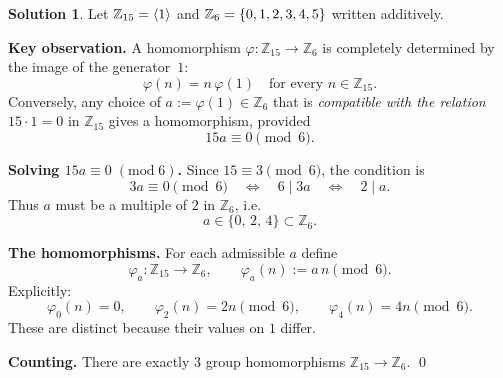 \documentclass[12pt]{article}
\theoremstyle{definition} %
\newtheorem{solution}{Solution}
\theoremstyle{plain} %
\begin{document}
        \begin{solution}
          Let $\Bbb Z_{15}=\langle 1\rangle$ and $\Bbb Z_{6}=\{0,1,2,3,4,5\}$ written additively.
          
          \medskip
          \textbf{Key observation.}  
          A homomorphism $\varphi:\mathbb{Z}_{15}\to\mathbb{Z}_{6}$ is completely determined by the image of the generator~$1$:
          \[
                  \varphi(n)=n\,\varphi(1)\quad\text{for every }n\in\mathbb{Z}_{15}.
          \]
          Conversely, any choice of $a:=\varphi(1)\in\mathbb{Z}_{6}$ that is \emph{compatible with the relation}
          $15\cdot 1 = 0$ in $\mathbb{Z}_{15}$ gives a homomorphism, provided
          \[
                  15a \equiv 0 \pmod{6}.
          \]
          
          \medskip
          \textbf{Solving $15a\equiv 0\;(\mathrm{mod}\;6)$.}\;
          Since $15\equiv 3\pmod 6$, the condition is
          \[
                  3a \equiv 0 \pmod 6
                  \quad\Longleftrightarrow\quad
                  6 \mid 3a
                  \quad\Longleftrightarrow\quad
                  2 \mid a.
          \]
          Thus $a$ must be a multiple of $2$ in $\mathbb{Z}_{6}$, i.e.\ 
          \[
             a\in\{0,\,2,\,4\}\subset\mathbb{Z}_{6}.
          \]
          
          \medskip
          \textbf{The homomorphisms.}\;
          For each admissible $a$ define
          \[
                \varphi_{a} :\mathbb{Z}_{15}\longrightarrow\mathbb{Z}_{6},
                \qquad
                \varphi_{a}(n):=a\,n \pmod 6.
          \]
          Explicitly:
          \[
          \varphi_{0}(n)=0,\qquad
          \varphi_{2}(n)=2n\pmod 6,\qquad
          \varphi_{4}(n)=4n\pmod 6.
          \]
          These are distinct because their values on $1$ differ.
          
          \medskip
          \textbf{Counting.}\;
          There are exactly \(\boxed{3}\) group homomorphisms
          \(\mathbb{Z}_{15}\to\mathbb{Z}_{6}\).
          \qed
          \end{solution}
\end{document}
